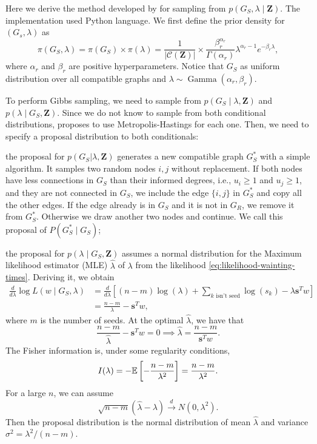 Here we derive the method developed by \textcite{crawford2016} for sampling
from $p(G_S, \lambda \mid \boldsymbol{Z})$. The
implementation used Python language. We first define
the prior density for $(G_s, \lambda)$ as 
$$
\pi(G_S, \lambda) = \pi(G_S) \times \pi(\lambda) = \frac{1}{|\mathcal{C}(\boldsymbol{Z})|} \times \frac{\beta_{r}^{\alpha_{r}}}{\Gamma(\alpha_{r})}\lambda^{\alpha_r - 1}e^{-\beta_r \lambda}, 
$$
where $\alpha_r$ and $\beta_r$ are positive hyperparameters. Notice that $G_S$
as uniform distribution over all compatible graphs and $\lambda \sim
\operatorname{Gamma}(\alpha_r, \beta_r)$.

To perform Gibbs sampling, we need to sample from $p(G_S \mid \lambda,
\boldsymbol{Z})$ and $p(\lambda \mid G_S , \boldsymbol{Z})$. Since we do not
know to sample from both conditional distributions, \textcite{crawford2016}
proposes to use Metropolis-Hastings for each one. Then, we need to specify a
proposal distribution to both conditionals:
\begin{alineas}
  \item the proposal for $p (G_S | \lambda, \boldsymbol{Z})$ generates a new compatible graph
   $G_S^*$ with a simple algorithm. It samples two random nodes $i,j$
   without replacement. If both nodes have less connections in $G_S$ than
   their informed degrees, i.e., $u_i \ge 1$ and
   $u_j \ge 1$, and they are not connected in $G_S$, we include the edge
   $\{i,j\}$ in $G_S^*$ and copy all the other edges. If the edge already is
   in $G_S$ and it is not in $G_R$, we remove it from $G_S^*$. Otherwise we
   draw another two nodes and continue. We call this proposal of $P(G_S^* \mid
   G_S)$; 
   \item the proposal for $p(\lambda \mid G_S, \boldsymbol{Z})$ assumes a
   normal distribution for the Maximum likelihood estimator (MLE)
   $\hat{\lambda}$ of $\lambda$ from the likelihood
   \eqref{eq:likelihood-wainting-times}. Deriving it, we obtain 
   \begin{equation*}
     \begin{split}
      \frac{d}{d \lambda} \log L(w \mid G_S, \lambda) &= \frac{d}{d \lambda}\left[ (n - m)\log(\lambda) + \sum_{k \text{ isn't seed}} \log(s_k) - \lambda \boldsymbol{s}^Tw\right] \\
      &= \frac{n-m}{\lambda} - \boldsymbol{s}^Tw,
     \end{split}
   \end{equation*}
   where $m$ is the number of seeds. At the optimal $\hat{\lambda}$, we have
   that 
   $$
   \frac{n-m}{\hat{\lambda}} - \boldsymbol{s}^Tw = 0 \implies \hat{\lambda} = \frac{n-m}{\boldsymbol{s}^Tw}.
   $$
   The Fisher information is, under some regularity conditions,
   $$
   I(\lambda) = -\mathbb{E}\left[-\frac{n-m}{\lambda^2}\right] = \frac{n-m}{\lambda^2}.
   $$
   For a large $n$, we can assume
   $$\sqrt{n-m}(\hat{\lambda} - \lambda) \overset{d}{\to} N(0, \lambda^2).$$ 
   Then the proposal distribution is the normal distribution of mean
   $\hat{\lambda}$ and variance $\sigma^2 = \lambda^2/(n - m)$.
\end{alineas} 

